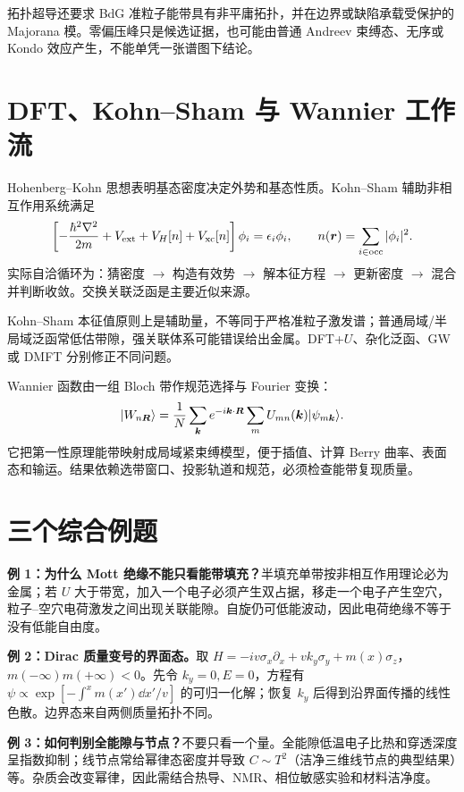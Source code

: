 拓扑超导还要求 BdG 准粒子能带具有非平庸拓扑，并在边界或缺陷承载受保护的 Majorana 模。零偏压峰只是候选证据，也可能由普通 Andreev 束缚态、无序或 Kondo 效应产生，不能单凭一张谱图下结论。

\section{DFT、Kohn--Sham 与 Wannier 工作流}
Hohenberg--Kohn 思想表明基态密度决定外势和基态性质。Kohn--Sham 辅助非相互作用系统满足
\[
\left[-\frac{\hbar^2\nabla^2}{2m}+V_{\rm ext}
+V_H[n]+V_{\rm xc}[n]\right]\phi_i
=\epsilon_i\phi_i,
\qquad n(\bm{r})=\sum_{i\in{\rm occ}}|\phi_i|^2.
\]
实际自洽循环为：猜密度 $\to$ 构造有效势 $\to$ 解本征方程 $\to$ 更新密度
$\to$ 混合并判断收敛。交换关联泛函是主要近似来源。

Kohn--Sham 本征值原则上是辅助量，不等同于严格准粒子激发谱；普通局域/半局域泛函常低估带隙，强关联体系可能错误给出金属。DFT+$U$、杂化泛函、GW 或 DMFT 分别修正不同问题。

Wannier 函数由一组 Bloch 带作规范选择与 Fourier 变换：
\[
|W_{n\bm{R}}\rangle=\frac1N\sum_{\bm{k}}
e^{-i\bm{k}\cdot\bm{R}}\sum_mU_{mn}(\bm{k})|\psi_{m\bm{k}}\rangle.
\]
它把第一性原理能带映射成局域紧束缚模型，便于插值、计算 Berry 曲率、表面态和输运。结果依赖选带窗口、投影轨道和规范，必须检查能带复现质量。

\section{三个综合例题}
\begin{examplebox}
\textbf{例 1：为什么 Mott 绝缘不能只看能带填充？}半填充单带按非相互作用理论必为金属；若 $U$ 大于带宽，加入一个电子必须产生双占据，移走一个电子产生空穴，粒子--空穴电荷激发之间出现关联能隙。自旋仍可低能波动，因此电荷绝缘不等于没有低能自由度。
\end{examplebox}

\begin{examplebox}
\textbf{例 2：Dirac 质量变号的界面态。}取
$H=-iv\sigma_x\partial_x+vk_y\sigma_y+m(x)\sigma_z$，
$m(-\infty)m(+\infty)<0$。先令 $k_y=0,E=0$，方程有
$\psi\propto\exp[-\int^xm(x')\dd x'/v]$ 的可归一化解；恢复
$k_y$ 后得到沿界面传播的线性色散。边界态来自两侧质量拓扑不同。
\end{examplebox}

\begin{examplebox}
\textbf{例 3：如何判别全能隙与节点？}不要只看一个量。全能隙低温电子比热和穿透深度呈指数抑制；线节点常给幂律态密度并导致 $C\sim T^2$（洁净三维线节点的典型结果）等。杂质会改变幂律，因此需结合热导、NMR、相位敏感实验和材料洁净度。
\end{examplebox}

